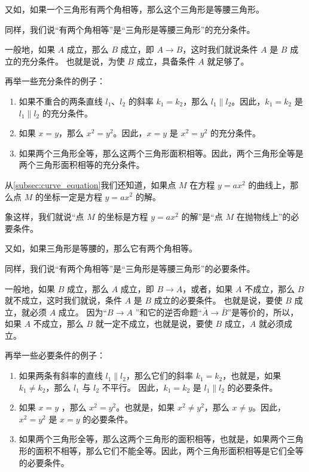 又如，如果一个三角形有两个角相等，那么这个三角形是等腰三角形。

同样，我们说“有两个角相等”是“三角形是等腰三角形”的充分条件。

一般地，如果 $A$ 成立，那么 $B$ 成立，即 $A \to B$，这时我们就说条件 $A$ 是 $B$ 成立的充分条件。
也就是说，为使 $B$ 成立，具备条件 $A$ 就足够了。

再举一些充分条件的例子：
\begin{enumerate}
  \item 如果不重合的两条直线 $l_1$、$l_2$ 的斜率 $k_1=k_2$，那么 $l_1\parallel l_2$。因此，$k_1=k_2$ 是 $l_1\parallel l_2$ 的充分条件。
  \item 如果 $x=y$，那么 $x^2=y^2$。因此，$x=y$ 是 $x^2=y^2$ 的充分条件。
  \item 如果两个三角形全等，那么这两个三角形面积相等。因此，两个三角形全等是两个三角形面积相等的充分条件。
\end{enumerate}

从\cref{subsec:curve_equation}我们还知道，如果点 $M$ 在方程 $y=ax^2$ 的曲线上，那么点 $M$ 的坐标一定是方程 $y=ax^2$ 的解。

象这样，我们就说“点 $M$ 的坐标是方程 $y = a{x}^{2}$ 的解”是“点 $M$ 在抛物线上”的必要条件。

又如，如果三角形是等腰的，那么它有两个角相等。

同样，我们说“有两个角相等”是“三角形是等腰三角形”的必要条件。

一般地，如果 $B$ 成立，那么 $A$ 成立，即 $B \to A$，或者，如果 $A$ 不成立，那么 $B$ 就不成立，这时我们就说，条件 $A$ 是 $B$ 成立的必要条件。
也就是说，要使 $B$ 成立，就必须 $A$ 成立。
因为“$B \to A$ ”和它的逆否命题“$\bar{A} \to \bar{B}$”是等价的，所以，如果 $A$ 不成立，那么 $B$ 就一定不成立，也就是说，要使 $B$ 成立，$A$ 就必须成立。

再举一些必要条件的例子：
\begin{enumerate}
  \item 如果两条有斜率的直线 $l_1\parallel l_2$，那么它们的斜率 $k_1=k_2$，也就是，如果 $k_1\neq k_2$，那么 $l_1$ 与 $l_2$ 不平行。
  因此，$k_1=k_2$ 是 $l_1\parallel l_2$ 的必要条件。
  \item 如果 $x=y$ ，那么 $x^2=y^2$。也就是，如果 $x^2\neq y^2$，那么 $x\neq y$。因此，$x^2=y^2$ 是 $x=y$ 的必要条件。
  \item 如果两个三角形全等，那么这两个三角形的面积相等，也就是，如果两个三角形的面积不相等，那么它们不能全等。因此，两个三角形面积相等是它们全等的必要条件。
\end{enumerate}

